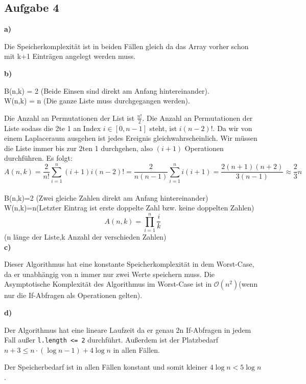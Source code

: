 \documentclass[a4paper,graphics,11pt]{article}
\newcommand{\aufgabe}[1]{\subsection*{Aufgabe #1}}
\begin{document}
\aufgabe{4}
\textbf{a)}

Die Speicherkomplexität ist in beiden Fällen gleich da das Array vorher schon mit k+1 Einträgen angelegt werden muss.

\textbf{b)}

B(n,k) = 2 \quad (Beide Einsen sind direkt am Anfang hintereinander).\\
W(n,k) = n  \quad (Die ganze Liste muss durchgegangen werden).

Die Anzahl an Permutationen der List ist $\frac{n!}{2}$.
Die Anzahl an Permutationen der Liste sodass die 2te 1 an Index $i \in [0, n-1]$ steht, ist
$i(n - 2)!$. Da wir von einem Laplaceraum ausgehen ist jedes Ereignis gleichwahrscheinlich. Wir müssen die Liste
immer bis zur 2ten 1 durchgehen, also $(i+1)$ Operationen durchführen. Es folgt:
$$
    A(n,k) = \frac{2}{n!}\sum_{i=1}^{n}(i+1) i(n-2)!
    = \frac{2}{n(n-1)} \sum_{i=1}^{n} i(i+1)
    = \frac{2(n+1)(n+2)}{3(n-1)} \approx \frac{2}{3}n
$$
\\
B(n,k)=2 (Zwei gleiche Zahlen direkt am Anfang hintereinander)\\
W(n,k)=n(Letzter Eintrag ist erste doppelte Zahl bzw. keine doppelten Zahlen)\\
$$
A(n,k)=\prod_{i=1}^{n}\frac{i}{k}
$$
   (n länge der Liste,k Anzahl der verschieden Zahlen)\\
\newpage
\textbf{c)}




Dieser Algorithmus hat eine konstante Speicherkomplexität in dem Worst-Case, da er unabhängig von n immer nur zwei Werte speichern muss.
Die Asymptotische Komplexität des Algorithmus im Worst-Case ist in $\mathcal{O}(n^2)$(wenn nur die If-Abfragen als Operationen gelten).


\textbf{d)}


Der Algorithmus hat eine lineare Laufzeit da er genau 2n If-Abfragen in jedem Fall außer \texttt{l.length <= 2} durchführt.
Außerdem ist der Platzbedarf $n + 3 \le n\cdot(\log n-1 )+ 4\log n$ in allen Fällen.\\[50pt]

\newpage

Der Speicherbedarf ist in allen Fällen konstant und somit kleiner $4\log n < 5 \log n$.
 
\end{document}
